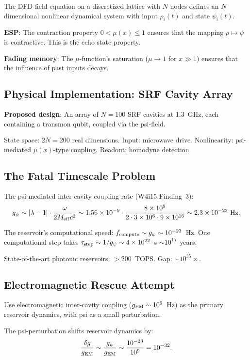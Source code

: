\documentclass[11pt]{article}
\theoremstyle{definition}
\theoremstyle{remark}
\newcommand{\ee}[1]{\times 10^{#1}}
\newcommand{\lamdiff}{|\lambda-1|}
\begin{document}
The DFD field equation on a discretized lattice with $N$ nodes defines an
$N$-dimensional nonlinear dynamical system with input $\rho_i(t)$ and state
$\psi_i(t)$.

\textbf{ESP}: The contraction property $0 < \mu(x) \leq 1$ ensures that the
mapping $\rho \mapsto \psi$ is contractive.  This is the echo state property.

\textbf{Fading memory}: The $\mu$-function's saturation ($\mu \to 1$ for
$x \gg 1$) ensures that the influence of past inputs decays.

\subsection{Physical Implementation: SRF Cavity Array}

\textbf{Proposed design}: An array of $N = 100$ SRF cavities at 1.3~GHz,
each containing a transmon qubit, coupled via the psi-field.

State space: $2N = 200$ real dimensions.  Input: microwave drive.
Nonlinearity: psi-mediated $\mu(x)$-type coupling.  Readout: homodyne detection.

\subsection{The Fatal Timescale Problem}

The psi-mediated inter-cavity coupling rate (W4i15 Finding~3):
\begin{equation}
  g_\psi \sim \lamdiff \cdot \frac{\omega}{2 M_{\rm eff} c^2}
  \sim 1.56\ee{-9} \cdot \frac{8\ee{9}}{2 \cdot 3\ee{6} \cdot 9\ee{16}}
  \sim 2.3\ee{-23}~\text{Hz}.
\end{equation}

The reservoir's computational speed: $f_{\rm compute} \sim g_\psi \sim
10^{-23}$~Hz.  One computational step takes $\tau_{\rm step} \sim 1/g_\psi
\sim 4\ee{22}$~s $\sim 10^{15}$~years.

State-of-the-art photonic reservoirs: $> 200$~TOPS.
Gap: $\sim 10^{35}\times$.

\subsection{Electromagnetic Rescue Attempt}

Use electromagnetic inter-cavity coupling ($g_{\rm EM} \sim 10^9$~Hz) as the
primary reservoir dynamics, with psi as a small perturbation.

The psi-perturbation shifts reservoir dynamics by:
\begin{equation}
  \frac{\delta g}{g_{\rm EM}} \sim \frac{g_\psi}{g_{\rm EM}}
  \sim \frac{10^{-23}}{10^9} = 10^{-32}.
\end{equation}
\end{document}
